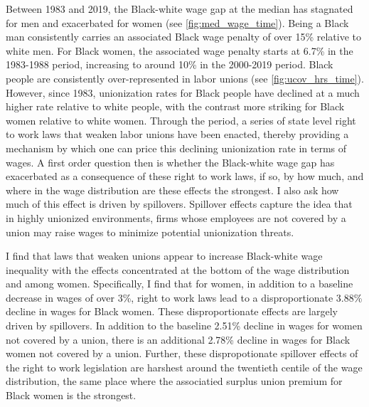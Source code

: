 \documentclass[11pt]{article}
\begin{document}
Between 1983 and 2019, the Black-white wage gap at the median has stagnated for men and exacerbated for women (see \autoref{fig:med_wage_time}). Being a Black man consistently carries an associated Black wage penalty of over 15\% relative to white men. For Black women, the associated wage penalty starts at 6.7\% in the 1983-1988 period, increasing to around 10\% in the 2000-2019 period. Black people are consistently over-represented in labor unions (see \autoref{fig:ucov_hrs_time}). However, since 1983, unionization rates for Black people have declined at a much higher rate relative to white people, with the contrast more striking for Black women relative to white women. Through the period, a series of state level right to work laws that weaken labor unions have been enacted, thereby providing a mechanism by which one can price this declining unionization rate in terms of wages. A first order question then is whether the Black-white wage gap has exacerbated as a consequence of these right to work laws, if so, by how much, and where in the wage distribution are these effects the strongest. I also ask how much of this effect is driven by spillovers. Spillover effects capture the idea that in highly unionized environments, firms whose employees are not covered by a union may raise wages to minimize potential unionization threats. 

I find that laws that weaken unions appear to increase Black-white wage inequality with the effects concentrated at the bottom of the wage distribution and among women. Specifically, I find that for women, in addition to a baseline decrease in wages of over 3\%, right to work laws lead to a disproportionate 3.88\% decline in wages for Black women. These disproportionate effects are largely driven by spillovers. In addition to the baseline 2.51\% decline in wages for women not covered by a union, there is an additional 2.78\% decline in wages for Black women not covered by a union. Further, these dispropotionate spillover effects of the right to work legislation are harshest around the twentieth centile of the wage distribution, the same place where the associatied surplus union premium for Black women is the strongest.
\end{document}
